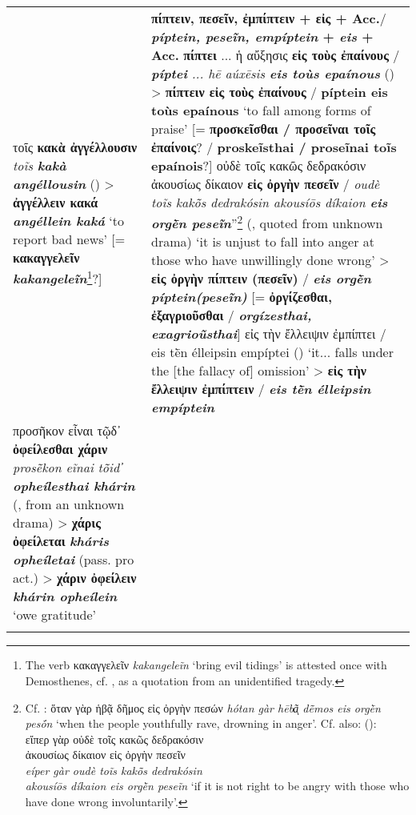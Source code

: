 \documentclass[output=paper,colorlinks,citecolor=brown]{langscibook}
\begin{document}
{\begin{xltabular}{\textwidth}{XX}
    τοῖς \textbf{κακὰ ἀγγέλλουσιν} \textit{toĩs \textbf{kakà angéllousin}} () > \textbf{ἀγγέλλειν κακά} \textit{\textbf{angéllein kaká}} ‘to report bad news' [= \textbf{κακαγγελεῖν} \textbf{\textit{kakangeleĩn}}\footnote{The verb κακαγγελεῖν \textit{kakangeleĩn} ‘bring evil tidings' is attested once with Demosthenes, cf. , as a quotation from an unidentified tragedy.}?] & \textbf{πίπτειν, πεσεῖν, ἐμπίπτειν + εἰς + Acc.}/ \textbf{\textit{píptein, peseĩn, empíptein} + \textit{eis} + Acc.} \newline \textbf{πίπτει} ... ἡ αὔξησις \textbf{εἰς τοὺς ἐπαίνους} / \textit{\textbf{píptei} ... hē aúxēsis \textbf{eis toùs epaínous}} () > \textbf{πίπτειν εἰς τοὺς ἐπαίνους} / \textbf{píptein eis toùs epaínous} ‘to fall among forms of praise' [= \textbf{προσκεῖσθαι / προσεῖναι τοῖς ἐπαίνοις}? / \textbf{proskeĩsthai / proseĩnai toĩs epaínois}?] \newline οὐδὲ τοῖς κακῶς δεδρακόσιν ἀκουσίως δίκαιον \textbf{εἰς ὀργὴν πεσεῖν} / \textit{oudè toĩs kakō̃s dedrakósin akousíōs díkaion \textbf{eis orgḕn peseĩn}}”\footnote{Cf. : ὅταν γὰρ ἡβᾷ δῆμος εἰς ὀργὴν πεσών \textit{hótan gàr hēbãͅ dē̃mos eis orgḕn pesṓn} ‘when the people youthfully rave, drowning in anger'. Cf. also:  (\citealt{Nauck1889}):\\ εἴπερ γὰρ οὐδὲ τοῖς κακῶς δεδρακόσιν\\ ἀκουσίως δίκαιον εἰς ὀργὴν πεσεῖν\\ \textit{eíper gàr oudè toĩs kakō̃s dedrakósin}\\ \textit{akousíōs díkaion eis orgḕn peseĩn} ‘if it is not right to be angry with those who have done wrong involuntarily'.} (, quoted from unknown drama) ‘it is unjust to fall into anger at those who have unwillingly done wrong' > \textbf{εἰς ὀργὴν πίπτειν (πεσεῖν)} / \textit{\textbf{eis orgḕn píptein(peseĩn)}} [= \textbf{ὀργίζεσθαι, ἐξαγριοῦσθαι} / \textit{\textbf{orgízesthai, exagrioũsthai}}] \newline εἰς τὴν ἔλλειψιν ἐμπίπτει / eis tḕn élleipsin empíptei () ‘it... falls under the [the fallacy of] omission' > \textbf{εἰς τὴν ἔλλειψιν ἐμπίπτειν} / \textit{\textbf{eis tḕn élleipsin empíptein}} \\ προσῆκον εἶναι τῷδ᾽ \textbf{ὀφείλεσθαι χάριν} \textit{prosē̃kon eĩnai tō̃id᾽ \textbf{opheílesthai khárin}} (, from an unknown drama) > \textbf{χάρις ὀφείλεται} \textit{\textbf{kháris opheíletai}} (pass. pro act.) > \textbf{χάριν ὀφείλειν} \textbf{\textit{khárin opheílein}} ‘owe gratitude' & \\
    \lspbottomrule
\end{xltabular}
}
\end{document}
